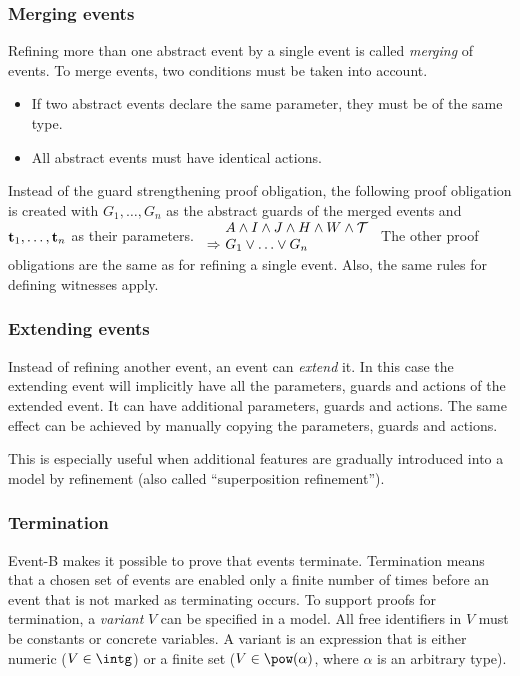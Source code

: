 \subsubsection{Merging events}
\label{merging_events}
Refining more than one abstract event by a single event is called \emph{merging} of events.
To merge events, two conditions must be taken into account.
\begin{itemize}
\item If two abstract events declare the same parameter, they must be of the same type.
\item All abstract events must have identical actions.
\end{itemize}
Instead of the guard strengthening proof obligation, the following proof obligation is
created with $G_1,\ldots,G_n$ as the abstract guards of the merged events
  and $\mathbf{t}_1,\ldots,\mathbf{t}_n$ as their parameters.
%
  {$\begin{array}{l@{\ }l}
      & A \land I \land J \land H \land W \land \concbeforeafter \\
      \limp & G_1\lor\ldots\lor G_n
    \end{array}
$}
The other proof obligations are the same as for refining a single event.
Also, the same rules for defining witnesses apply.

\subsubsection{Extending events}
\label{extending_events}
Instead of refining another event, an event can \emph{extend} it.
In this case the extending event will implicitly have all the parameters, 
 guards and actions of the extended event. It can have additional parameters,
 guards and actions. The same effect can be achieved by manually copying the parameters, guards and actions.

This is especially useful when additional features are gradually introduced
 into a model by refinement (also called ``superposition refinement'').

\subsubsection{Termination}
\label{termination}
Event-B makes it possible to prove that events terminate.
Termination means that a chosen set of events are enabled only a finite number
 of times before an event that is not marked as terminating occurs.
To support proofs for termination, a \emph{variant} $V$ can be specified in a model.
 All free identifiers in $V$ must be constants or concrete variables.
A variant is an expression that is either numeric 
 ($V\in\intg$) or
 a finite set ($V\in\pow(\alpha)$,
 where $\alpha$ is an arbitrary type).

